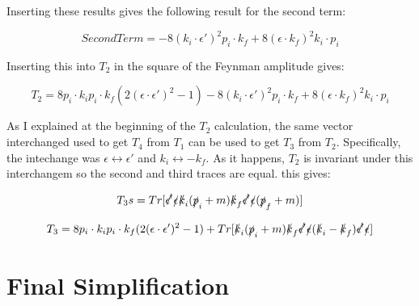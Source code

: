 \documentclass[a4]{article}
\begin{document}
    Inserting these results gives the following result for the second term:

    \begin{framed}
        \begin{equation}
            Second Term = -8 (k_i \cdot \epsilon')^2 p_i \cdot k_f + 8 (\epsilon \cdot k_f)^2 k_i \cdot p_i
        \end{equation}
    \end{framed}

    Inserting this into $T_2$ in the square of the Feynman amplitude gives:

    \begin{framed}
        \begin{equation}
            T_2 = 8 p_i \cdot k_i p_i \cdot k_f (2 (\epsilon \cdot \epsilon')^2 - 1) - 8 (k_i \cdot \epsilon')^2 p_i \cdot k_f + 8 (\epsilon \cdot k_f)^2 k_i \cdot p_i
        \end{equation}
    \end{framed}

    As I explained at the beginning of the $T_2$ calculation, the same vector interchanged used to get $T_4$ from $T_1$ can be used to get $T_3$ from $T_2$. Specifically,
    the intechange was $\epsilon \leftrightarrow \epsilon'$ and $k_i \leftrightarrow - k_f$. As it happens, $T_2$ is invariant under this interchangem so the second and
    third traces are equal. this gives:
    
    \begin{equation}
        T_3s = Tr [ \slashed{\epsilon'} \slashed{\epsilon} \slashed{k}_i (\slashed{p}_i + m) \slashed{k}_f \slashed{\epsilon'} \slashed{\epsilon} (\slashed{p}_f + m) ]
    \end{equation}

    \begin{framed}
        \begin{equation}
            T_3 = 8 p_i \cdot k_i p_i \cdot k_f (2 (\epsilon \cdot \epsilon')^2 - 1) + Tr [\slashed{k}_i (\slashed{p}_i + m) \slashed{k}_f \slashed{\epsilon'} \slashed{\epsilon} (\slashed{k}_i - \slashed{k}_f) \slashed{\epsilon'} \slashed{\epsilon}]
        \end{equation}
    \end{framed}

    \section*{Final Simplification}
    
\end{document}
